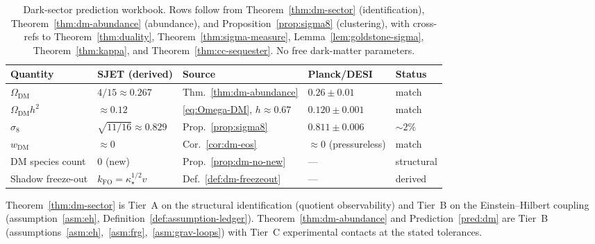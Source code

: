 \begin{table}[ht]
\centering
\small
\renewcommand{\arraystretch}{1.12}
\begin{tabular}{@{}lllll@{}}
\toprule
\textbf{Quantity} & \textbf{SJET (derived)} & \textbf{Source} & \textbf{Planck/DESI} & \textbf{Status} \\
\midrule
$\Omega_{\mathrm{DM}}$ & $4/15\approx 0.267$ & Thm.~\ref{thm:dm-abundance} & $0.26\pm 0.01$ & match \\
$\Omega_{\mathrm{DM}}h^2$ & $\approx 0.12$ & \eqref{eq:Omega-DM}, $h\approx 0.67$ & $0.120\pm 0.001$ & match \\
$\sigma_8$ & $\sqrt{11/16}\approx 0.829$ & Prop.~\ref{prop:sigma8} & $0.811\pm 0.006$ & $\sim 2\%$ \\
$w_{\mathrm{DM}}$ & $\approx 0$ & Cor.~\ref{cor:dm-eos} & $\approx 0$ (pressureless) & match \\
DM species count & $0$ (new) & Prop.~\ref{prop:dm-no-new} & --- & structural \\
Shadow freeze-out & $k_{\mathrm{FO}}=\kappa_\star^{1/2}v$ & Def.~\ref{def:dm-freezeout} & --- & derived \\
\bottomrule
\end{tabular}
\caption{Dark-sector prediction workbook. Rows follow from
Theorem~\ref{thm:dm-sector} (identification),
Theorem~\ref{thm:dm-abundance} (abundance), and
Proposition~\ref{prop:sigma8} (clustering), with cross-refs to
Theorem~\ref{thm:duality}, Theorem~\ref{thm:sigma-measure},
Lemma~\ref{lem:goldstone-sigma}, Theorem~\ref{thm:kappa}, and
Theorem~\ref{thm:cc-sequester}. No free dark-matter parameters.}
\label{tab:dark-sector}
\end{table}

\begin{remark}
Theorem~\ref{thm:dm-sector} is Tier~A on the structural identification
(quotient observability) and Tier~B on the Einstein--Hilbert coupling
(assumption~\ref{asm:eh}, Definition~\ref{def:assumption-ledger}).
Theorem~\ref{thm:dm-abundance} and Prediction~\ref{pred:dm} are Tier~B
(assumptions~\ref{asm:eh},~\ref{asm:frg},~\ref{asm:grav-loops}) with
Tier~C experimental contacts at the stated tolerances.
\end{remark}